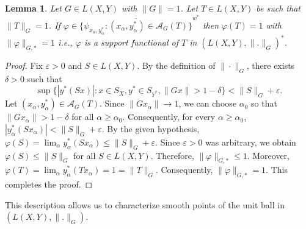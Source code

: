 \documentclass[12pt]{amsart}
\newtheorem{lemma}[theorem]{Lemma}
\theoremstyle{definition}
\numberwithin{equation}{section}
\begin{document}
	\begin{lemma}\label{lem:A}
		Let $G\in L(X, Y)$ with $\|G\|=1$. Let $T\in L(X, Y)$ be such that $\|T\|_G=1$. If $\varphi\in \overline{\{\psi_{x_\alpha,y_\alpha^*}:(x_\alpha,y_\alpha^*)\in\mathcal A_G(T)\}}^{w^*}$ then $\varphi(T)=1$ with $\|\varphi\|_{G, *}=1$ i.e., $\varphi$ is a support functional of $T$ in $(L(X, Y), \|.\|_G)^*$.
	\end{lemma}
	\begin{proof}
		Fix $\varepsilon>0$ and $S\in  L(X, Y)$. By the definition of $\|\cdot\|_G$, there exists $\delta>0$ such that
		\[
		\sup\bigl\{|y^*(Sx)|:x\in S_X, y^*\in S_{Y^*}, \|Gx\|>1-\delta\bigr\}
		<\|S\|_G+\varepsilon.
		\]
		Let $(x_\alpha,y_\alpha^*)\in\mathcal A_G(T)$. Since $\|Gx_\alpha\|\to 1$, we can choose $\alpha_0$ so that $\|Gx_\alpha\|>1-\delta$ for all $\alpha\geq\alpha_0$.
		Consequently, for every $\alpha\geq\alpha_0$, $|y_\alpha^*(Sx_\alpha)|<\|S\|_G+\varepsilon.$ By the given hypothesis, $\varphi(S)=\lim_\alpha y_\alpha^*(Sx_\alpha)\le\|S\|_G+\varepsilon.$ Since $\varepsilon>0$ was arbitrary, we obtain $\varphi(S)\le\|S\|_G$ for all $S\in  L(X, Y)$. Therefore, $\|\varphi\|_{G, *}\le 1$. Moreover, $\varphi(T)=\lim_\alpha y_\alpha^*(Tx_\alpha)=1=\|T\|_G.$ Consequently, $\|\varphi\|_{G, *}=1$. This completes the proof.
	\end{proof}
	
	
	This description allows us to characterize smooth points of the unit ball in $(L(X, Y), \|.\|_G)$.
	
\end{document}
